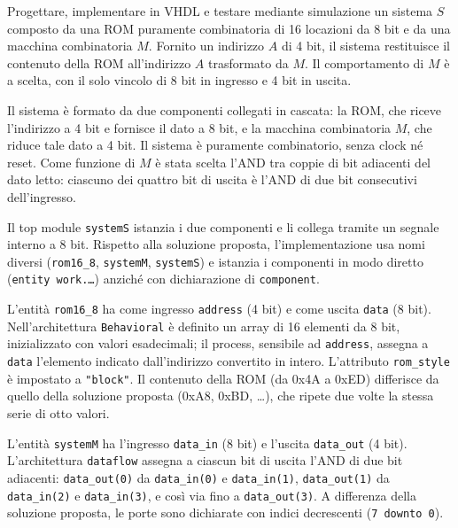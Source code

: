 \label{sec:esercizio2-1}

\begin{traccia}
Progettare, implementare in VHDL e testare mediante simulazione un sistema $S$ composto da una ROM puramente combinatoria di 16 locazioni da 8 bit e da una macchina combinatoria $M$. Fornito un indirizzo $A$ di 4 bit, il sistema restituisce il contenuto della ROM all'indirizzo $A$ trasformato da $M$. Il comportamento di $M$ è a scelta, con il solo vincolo di 8 bit in ingresso e 4 bit in uscita.
\end{traccia}

\progetto

Il sistema è formato da due componenti collegati in cascata: la ROM, che riceve l'indirizzo a 4 bit e fornisce il dato a 8 bit, e la macchina combinatoria $M$, che riduce tale dato a 4 bit. Il sistema è puramente combinatorio, senza clock né reset. Come funzione di $M$ è stata scelta l'AND tra coppie di bit adiacenti del dato letto: ciascuno dei quattro bit di uscita è l'AND di due bit consecutivi dell'ingresso.

Il top module \texttt{systemS} istanzia i due componenti e li collega tramite un segnale interno a 8 bit. Rispetto alla soluzione proposta, l'implementazione usa nomi diversi (\texttt{rom16\_8}, \texttt{systemM}, \texttt{systemS}) e istanzia i componenti in modo diretto (\texttt{entity work.\ldots}) anziché con dichiarazione di \texttt{component}. %

\implementazione

L'entità \texttt{rom16\_8} ha come ingresso \texttt{address} (4 bit) e come uscita \texttt{data} (8 bit). Nell'architettura \texttt{Behavioral} è definito un array di 16 elementi da 8 bit, inizializzato con valori esadecimali; il process, sensibile ad \texttt{address}, assegna a \texttt{data} l'elemento indicato dall'indirizzo convertito in intero. L'attributo \texttt{rom\_style} è impostato a \texttt{"block"}. Il contenuto della ROM (da 0x4A a 0xED) differisce da quello della soluzione proposta (0xA8, 0xBD, \ldots), che ripete due volte la stessa serie di otto valori.


L'entità \texttt{systemM} ha l'ingresso \texttt{data\_in} (8 bit) e l'uscita \texttt{data\_out} (4 bit). L'architettura \texttt{dataflow} assegna a ciascun bit di uscita l'AND di due bit adiacenti: \texttt{data\_out(0)} da \texttt{data\_in(0)} e \texttt{data\_in(1)}, \texttt{data\_out(1)} da \texttt{data\_in(2)} e \texttt{data\_in(3)}, e così via fino a \texttt{data\_out(3)}. A differenza della soluzione proposta, le porte sono dichiarate con indici decrescenti (\texttt{7 downto 0}).

